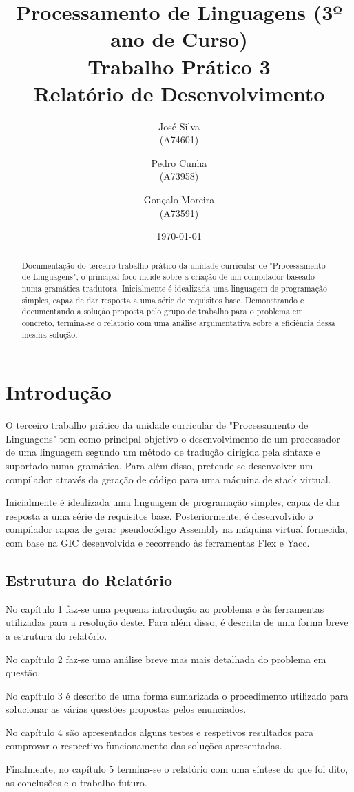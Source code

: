 \documentclass{report}
\title{Processamento de Linguagens (3º ano de Curso)\\ \textbf{Trabalho Prático 3}\\ Relatório de Desenvolvimento}
\author{José Silva\\ (A74601) \and Pedro Cunha\\ (A73958) \and Gonçalo Moreira\\ (A73591) }
\date{\today}
\begin{document}
\maketitle

\begin{abstract}
Documentação do terceiro trabalho prático da unidade curricular de "Processamento de Linguagens", o principal foco incide sobre a criação de um compilador baseado numa gramática tradutora. Inicialmente é idealizada uma linguagem de programação simples, capaz de dar resposta a uma série de requisitos base.
Demonstrando e documentando a solução proposta pelo grupo de trabalho para o problema em concreto, termina-se o relatório com uma análise argumentativa sobre a eficiência dessa mesma solução.

\end{abstract}

\tableofcontents


\chapter{Introdução} \label{intro}


O terceiro trabalho prático da unidade curricular de "Processamento de Linguagens" tem como principal objetivo o desenvolvimento de um processador de uma linguagem segundo um método de tradução dirigida pela sintaxe e suportado numa gramática. Para além disso,  pretende-se  desenvolver  um compilador através da geração de código para uma máquina de stack virtual. 
 
 
Inicialmente é idealizada uma linguagem de programação simples, capaz de dar resposta a uma série de requisitos base. Posteriormente, é desenvolvido o compilador  capaz de gerar pseudocódigo Assembly na máquina virtual fornecida, com base na GIC desenvolvida e recorrendo às ferramentas Flex e Yacc. 
 



\section*{Estrutura do Relatório} 

No capítulo 1 faz-se uma pequena introdução ao problema e às ferramentas utilizadas para a resolução deste. Para além disso, é descrita de uma forma breve a estrutura do relatório.\par
No capítulo 2 faz-se uma análise breve mas mais detalhada do problema em questão.\par
No capítulo 3 é descrito de uma forma sumarizada o procedimento utilizado para solucionar as várias questões propostas pelos enunciados.\par
No capítulo 4 são apresentados alguns testes e respetivos resultados para comprovar o respectivo funcionamento das soluções apresentadas.\par
Finalmente, no capítulo 5 termina-se o relatório com uma síntese do que foi dito, as conclusões e o trabalho futuro.
\end{document}

